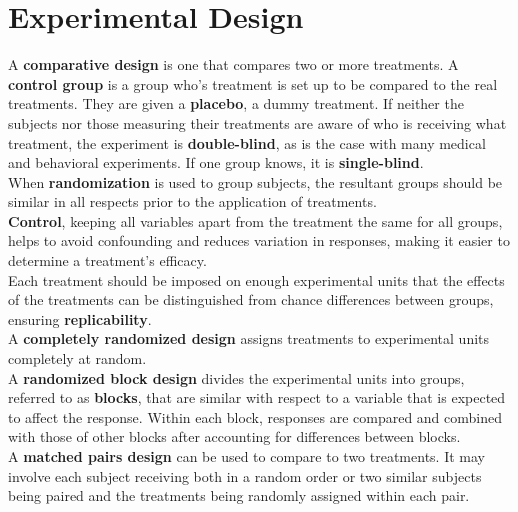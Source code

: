 \documentclass[../AP_Statistics.tex]{subfiles}
\begin{document}
		\section*{Experimental Design}
			A \textbf{comparative design} is one that compares two or more treatments.
			A \textbf{control group} is a group who's treatment is set up to be compared to the real treatments. They are given a \textbf{placebo}, a dummy treatment.
			If neither the subjects nor those measuring their treatments are aware of who is receiving what treatment, the experiment is \textbf{double-blind}, as is the case with many medical and behavioral experiments. If one group knows, it is \textbf{single-blind}. \\
			When \textbf{randomization} is used to group subjects, the resultant groups should be similar in all respects prior to the application of treatments. \\	
			\textbf{Control}, keeping all variables apart from the treatment the same for all groups, helps to avoid confounding and reduces variation in responses, making it easier to determine a treatment's efficacy.	\\
			Each treatment should be imposed on enough experimental units that the effects of the treatments can be distinguished from chance differences between groups, ensuring \textbf{replicability}. \\
			A \textbf{completely randomized design} assigns treatments to experimental units completely at random. \\
			A \textbf{randomized block design} divides the experimental units into groups, referred to as \textbf{blocks}, that are similar with respect to a variable that is expected to affect the response. Within each block, responses are compared and combined with those of other blocks after accounting for differences between blocks. \\
			A \textbf{matched pairs design} can be used to compare to two treatments. It may involve each subject receiving both in a random order or two similar subjects being paired and the treatments being randomly assigned within each pair.
\end{document}
